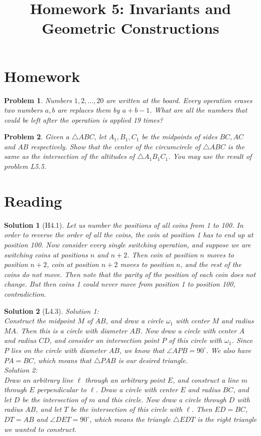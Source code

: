 \documentclass[a4paper,12pt]{article}
\title{Homework 5: Invariants and Geometric Constructions}
\theoremstyle{perfect}
\newtheorem{prb}{Problem}
\newtheorem{sol}{Solution}
\begin{document}
 
\maketitle
\section{Homework}
\begin{prb}
Numbers $1, 2, \ldots, 20$ are written at the board. Every operation erases two numbers $a,b$ are replaces them by $a+b-1$. What are all the numbers that could be left after the operation is applied 19 times?
\end{prb}

\begin{prb}
Given a $\triangle ABC$, let $A_1, B_1, C_1$ be the midpoints of sides $BC, AC$ and $AB$ respectively. Show that the center of the circumcircle of $\triangle ABC$ is the same as the intersection of the altitudes of $\triangle A_1B_1C_1$. You may use the result of problem L5.5.
\end{prb}

\section{Reading}

\begin{sol}[H4.1]
Let us number the positions of all coins from 1 to 100. In order to reverse the order of all the coins, the coin at position 1 has to end up at position 100. Now consider every single switching operation, and suppose we are switching coins at positions $n$ and $n+2$. Then coin at position $n$ moves to position $n+2$, coin at position $n+2$ moves to position $n$, and the rest of the coins do not move. Then note that the parity of the position of each coin does not change. But then coins 1 could never move from position 1 to position 100, contradiction.
\end{sol}

\begin{sol}[L4.3]
Solution 1:\\

\noindent Construct the midpoint $M$ of $AB$, and draw a circle $\omega_1$ with center $M$ and radius $MA$. Then this is a circle with diameter $AB$. Now draw a circle with center $A$ and radius $CD$, and consider an intersection point $P$ of this circle with $\omega_1$. Since $P$ lies on the circle with diameter $AB$, we know that $\angle APB = 90^\circ$. We also have $PA = BC$, which means that $\triangle PAB$ is our desired triangle.\\
Solution 2:\\

\noindent Draw an arbitrary line $\ell$ through an arbitrary point $E$, and construct a line $m$ through $E$ perpendicular to $\ell$. Draw a circle with center $E$ and radius $BC$, and let $D$ be the intersection of $m$ and this circle. Now draw a circle through $D$ with radius $AB$, and let $T$ be the intersection of this circle with $\ell$. Then $ED = BC$, $DT = AB$ and $\angle DET = 90^\circ$, which means the triangle $\triangle EDT$ is the right triangle we wanted to construct.
\end{sol}
\end{document}
